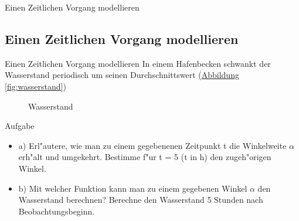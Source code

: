 \documentclass{standalone}
\begin{document}
\begin{frame}
  \begin{center}
    Einen Zeitlichen Vorgang modellieren
  \end{center}
  \subsection{Einen Zeitlichen Vorgang modellieren}
\end{frame}

\begin{frame}{Einen Zeitlichen Vorgang modellieren}
  \noindent In einem Hafenbecken schwankt der Wasserstand periodisch um seinen Durchschnittswert (\hyperref[fig:wasserstand]{Abbildung \autoref{fig:wasserstand}})

  \begin{figure}[hb!]
    \center
    \def\svgwidth{300px}
    
    \caption{Wasserstand}
    \label{fig:wasserstand}
  \end{figure}
\end{frame}


\begin{frame}{Aufgabe}
  \begin{itemize}
    \item<2-> a) Erl{"a}utere, wie man zu einem gegebenenen Zeitpunkt t die Winkelweite $\alpha$ erh{"a}lt und umgekehrt. Bestimme f{"u}r t = 5 (t in h) den zugeh{"o}rigen Winkel.
    \item<3-> b) Mit welcher Funktion kann man zu einem gegebenen Winkel $\alpha$ den Wasserstand berechnen? Berechne den Wasserstand 5 Stunden nach Beobachtungsbeginn.
  \end{itemize}
\end{frame}




\end{document}
